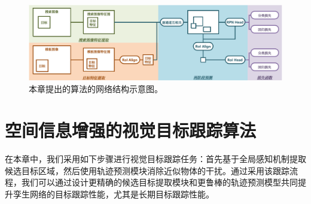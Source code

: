 \begin{figure}[t]
    \centering
    \includegraphics[width=1.0\textwidth]{Img/globally/SiamRCNN.pdf}
    \caption{本章提出的算法的网络结构示意图。}
    \label{fig:siamrcnn}
\end{figure}

\section{空间信息增强的视觉目标跟踪算法}

在本章中，我们采用如下步骤进行视觉目标跟踪任务：首先基于全局感知机制提取候选目标区域，然后使用轨迹预测模块消除近似物体的干扰。通过采用该跟踪流程，我们可以通过设计更精确的候选目标提取模块和更鲁棒的轨迹预测模型共同提升孪生网络的目标跟踪性能，尤其是长期目标跟踪性能。

